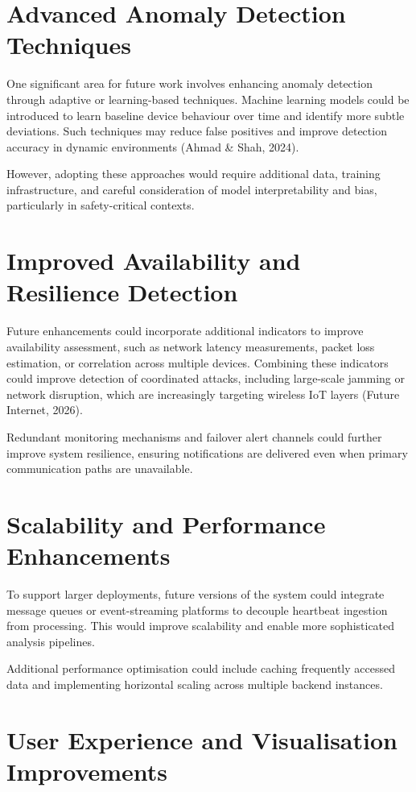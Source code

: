\section{Advanced Anomaly Detection Techniques}

One significant area for future work involves enhancing anomaly detection through adaptive or learning-based techniques. Machine learning models could be introduced to learn baseline device behaviour over time and identify more subtle deviations. Such techniques may reduce false positives and improve detection accuracy in dynamic environments (Ahmad \& Shah, 2024).

However, adopting these approaches would require additional data, training infrastructure, and careful consideration of model interpretability and bias, particularly in safety-critical contexts.

\section{Improved Availability and Resilience Detection}

Future enhancements could incorporate additional indicators to improve availability assessment, such as network latency measurements, packet loss estimation, or correlation across multiple devices. Combining these indicators could improve detection of coordinated attacks, including large-scale jamming or network disruption, which are increasingly targeting wireless IoT layers (Future Internet, 2026).

Redundant monitoring mechanisms and failover alert channels could further improve system resilience, ensuring notifications are delivered even when primary communication paths are unavailable.

\section{Scalability and Performance Enhancements}

To support larger deployments, future versions of the system could integrate message queues or event-streaming platforms to decouple heartbeat ingestion from processing. This would improve scalability and enable more sophisticated analysis pipelines.

Additional performance optimisation could include caching frequently accessed data and implementing horizontal scaling across multiple backend instances.

\section{User Experience and Visualisation Improvements}

